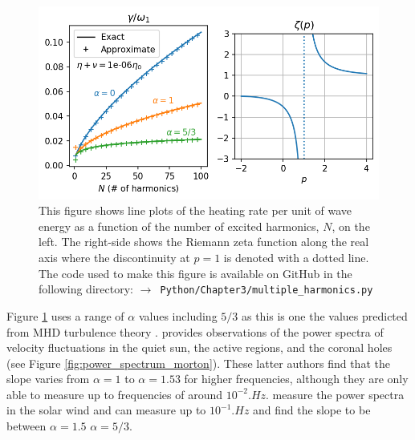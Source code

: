 \begin{figure}
    \centering
    \vspace{-20pt}
    \includegraphics[width=\textwidth,height=0.85\textheight,keepaspectratio]{figures/chapter03/multiple_harmonics.png}
    \vspace{-30pt}
    \caption{This figure shows line plots of the heating rate per unit of wave energy as a function of the number of excited harmonics, $N$, on the left. 
    The right-side shows the Riemann zeta function along the real axis where the discontinuity at $p=1$ is denoted with a dotted line. The code used to make this figure is available on GitHub in the following directory:\newline
    \texttt{$\rightarrow$ Python/Chapter3/multiple\_harmonics.py}}
    \vspace{-20pt}
    \label{fig:multiple_harmonics}
\end{figure}

Figure \ref{fig:multiple_harmonics} uses a range of $\alpha$ values including $5/3$ as this is one the values predicted from MHD turbulence theory \citep{Bruno2013}. \citet{Morton2016} provides observations of the power spectra of velocity fluctuations in the quiet sun, the active regions, and the coronal holes (see Figure \ref{fig:power_spectrum_morton}). These latter authors find that the slope varies from $\alpha = 1$ to $\alpha = 1.53$ for higher frequencies, although they are only able to measure up to frequencies of around $10^{-2}\si{.Hz}$. \citet{Podesta2007} measure the power spectra in the solar wind and can measure up to $10^{-1}\si{.Hz}$ and find the slope to be between $\alpha = 1.5$ $\alpha = 5/3$.

